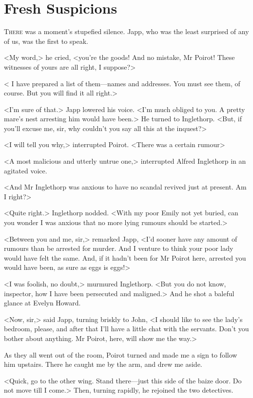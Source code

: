 \chapter{Fresh Suspicions} 

\lettrine{T}{here} was a moment's stupefied silence. Japp, who was the least surprised of any of us, was the first to speak. 

\zz
 <My word,> he cried, <you're the goods! And no mistake, Mr Poirot! These witnesses of yours are all right, I suppose?> 

\zz
 < I have prepared a list of them—names and addresses. You must see them, of course. But you will find it all right.> 

 <I'm sure of that.> Japp lowered his voice. <I'm much obliged to you. A pretty mare's nest arresting him would have been.> He turned to Inglethorp. <But, if you'll excuse me, sir, why couldn't you say all this at the inquest?> 

 <I will tell you why,> interrupted Poirot. <There was a certain rumour\longdash> 

 <A most malicious and utterly untrue one,> interrupted Alfred Inglethorp in an agitated voice. 

 <And Mr Inglethorp was anxious to have no scandal revived just at present. Am I right?> 

 <Quite right.> Inglethorp nodded. <With my poor Emily not yet buried, can you wonder I was anxious that no more lying rumours should be started.> 

 <Between you and me, sir,> remarked Japp, <I'd sooner have any amount of rumours than be arrested for murder. And I venture to think your poor lady would have felt the same. And, if it hadn't been for Mr Poirot here, arrested you would have been, as sure as eggs is eggs!> 

 <I was foolish, no doubt,> murmured Inglethorp. <But you do not know, inspector, how I have been persecuted and maligned.> And he shot a baleful glance at Evelyn Howard. 

 <Now, sir,> said Japp, turning briskly to John, <I should like to see the lady's bedroom, please, and after that I'll have a little chat with the servants. Don't you bother about anything. Mr Poirot, here, will show me the way.> 

 As they all went out of the room, Poirot turned and made me a sign to follow him upstairs. There he caught me by the arm, and drew me aside. 

 <Quick, go to the other wing. Stand there—just this side of the baize door. Do not move till I come.> Then, turning rapidly, he rejoined the two detectives. 

